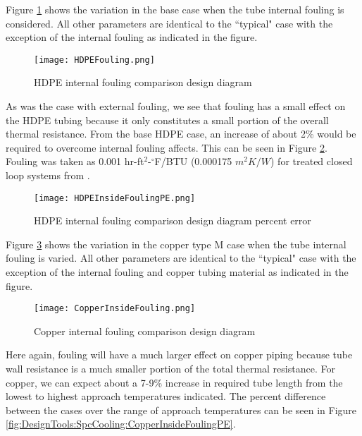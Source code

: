 Figure \ref{fig:DesignTools:SpcCooling:HDPEInsideFouling} shows the variation in the base case when the tube internal fouling is considered. All other parameters are identical to the ``typical" case with the exception of the internal fouling as indicated in the figure.

	\begin{figure}
		\centering
		\texttt{[image: HDPEFouling.png]}
		\caption{HDPE internal fouling comparison design diagram}
		\label{fig:DesignTools:SpcCooling:HDPEInsideFouling}
	\end{figure}
	
As was the case with external fouling, we see that fouling has a small effect on the HDPE tubing because it only constitutes a small portion of the overall thermal resistance. From the base HDPE case, an increase of about 2\% would be required to overcome internal fouling affects. This can be seen in Figure \ref{fig:DesignTools:SpcCooling:HDPEInsideFoulingPE}. Fouling was taken as 0.001 hr-ft$^2$-$^\circ$F/BTU (0.000175 $m^2K/W$) for treated closed loop systems from \cite{Chenoweth1990}.

	\begin{figure}
		\centering
		\texttt{[image: HDPEInsideFoulingPE.png]}
		\caption{HDPE internal fouling comparison design diagram percent error}
		\label{fig:DesignTools:SpcCooling:HDPEInsideFoulingPE}
	\end{figure}

Figure \ref{fig:DesignTools:SpcCooling:CopperInsideFouling} shows the variation in the copper type M case when the tube internal fouling is varied. All other parameters are identical to the ``typical" case with the exception of the internal fouling and copper tubing material as indicated in the figure.

	\begin{figure}
		\centering
		\texttt{[image: CopperInsideFouling.png]}
		\caption{Copper internal fouling comparison design diagram}
		\label{fig:DesignTools:SpcCooling:CopperInsideFouling}
	\end{figure}
	
Here again, fouling will have a much larger effect on copper piping because tube wall resistance is a much smaller portion of the total thermal resistance. For copper, we can expect about a 7-9\% increase in required tube length from the lowest to highest approach temperatures indicated. The percent difference between the cases over the range of approach temperatures can be seen in Figure \ref{fig:DesignTools:SpcCooling:CopperInsideFoulingPE}.

